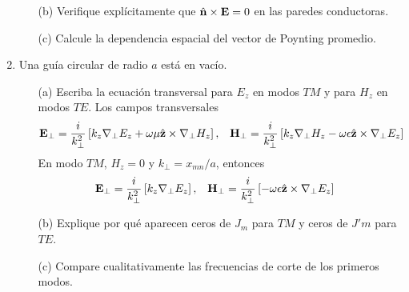 \documentclass[]{article}
\numberwithin{equation}{section}
\begin{document}
\begin{enumerate}
\begin{enumerate}
		\item[(b)] Verifique explícitamente que $\nhat \times \n{E} = 0$ en las paredes conductoras.
		\resp
		
		\item[(c)] Calcule la dependencia espacial del vector de Poynting promedio.
		\resp
		
	\end{enumerate}
	
	\item Una guía circular de radio $a$ está en vacío.
	\begin{enumerate}	
		\item[(a)] Escriba la ecuación transversal para $E_z$ en modos $T\!M$ y para $H_z$ en modos $T\!E$.
		\resp Los campos transversales
		\begin{align*}
			\mathbf{E}_\perp &= \frac{i}{k_\perp^2}\left[k_z\nabla_\perp E_z + \omega\mu\hat{\mathbf{z}}\times\nabla_\perp H_z\right], & \mathbf{H}_\perp &= \frac{i}{k_\perp^2}\left[k_z\nabla_\perp H_z - \omega\epsilon\hat{\mathbf{z}}\times\nabla_\perp E_z\right]
		\end{align*}
		En modo $T\!M$, $H_z = 0$ y $k_\perp = x_{mn}/a$, entonces
		\begin{align*}
			\mathbf{E}_\perp &= \frac{i}{k_\perp^2}\left[k_z\nabla_\perp E_z\right], & \mathbf{H}_\perp &= \frac{i}{k_\perp^2}\left[- \omega\epsilon\hat{\mathbf{z}}\times\nabla_\perp E_z\right]
		\end{align*}
		
		\item[(b)] Explique por qué aparecen ceros de $J_m$ para $T\!M$ y ceros de $J'm$ para $T\!E$.
		\resp
		
		\item[(c)] Compare cualitativamente las frecuencias de corte de los primeros modos.
		\resp
		
	\end{enumerate}
	

\end{enumerate}
\end{document}
